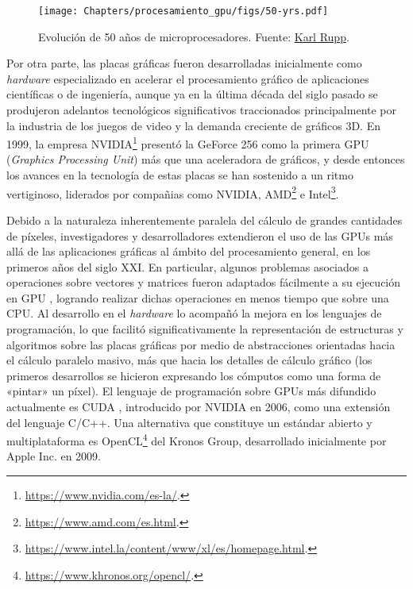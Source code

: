 \begin{figure}
\begin{center}
    \texttt{[image: Chapters/procesamiento\_gpu/figs/50-yrs.pdf]}
    \caption{Evolución de 50 años de microprocesadores. Fuente: \href{https://github.com/karlrupp/microprocessor-trend-data}{Karl Rupp}.}
    \label{fig:moore}
\end{center}
\end{figure}

Por otra parte, las placas gráficas fueron desarrolladas inicialmente como \textit{hardware} especializado en acelerar el procesamiento gráfico de aplicaciones científicas o de ingeniería, aunque ya en la última década del siglo pasado se produjeron adelantos tecnológicos significativos traccionados principalmente por la industria de los juegos de video y la demanda creciente de gráficos 3D. En 1999, la empresa NVIDIA\footnote{\url{https://www.nvidia.com/es-la/}.} presentó la GeForce 256 como la primera GPU (\textit{Graphics Processing Unit}) más que una aceleradora de gráficos, y desde entonces los avances en la tecnología de estas placas se han sostenido a un ritmo vertiginoso, liderados por compañias como NVIDIA, AMD\footnote{\url{https://www.amd.com/es.html}.} e Intel\footnote{\url{https://www.intel.la/content/www/xl/es/homepage.html}.}.

Debido a la naturaleza inherentemente paralela del cálculo de grandes cantidades de píxeles, investigadores y desarrolladores extendieron el uso de las GPUs más allá de las aplicaciones gráficas al ámbito del procesamiento general, en los primeros años del siglo XXI. En particular, algunos problemas asociados a operaciones sobre vectores y matrices fueron adaptados fácilmente a su ejecución en GPU \cite{thompson2002, bolz2003, kruger2003}, logrando realizar dichas operaciones en menos tiempo que sobre una CPU. Al desarrollo en el \textit{hardware} lo acompañó la mejora en los lenguajes de programación, lo que facilitó significativamente la representación de estructuras y algoritmos sobre las placas gráficas por medio de abstracciones orientadas hacia el cálculo paralelo masivo, más que hacia los detalles de cálculo gráfico (los primeros desarrollos se hicieron expresando los cómputos como una forma de «pintar» un píxel). El lenguaje de programación sobre GPUs más difundido actualmente es CUDA \cite{cuda}, introducido por NVIDIA en 2006, como una extensión del lenguaje C/C++. Una alternativa que constituye un estándar abierto y multiplataforma es OpenCL\footnote{\url{https://www.khronos.org/opencl/}.} del Kronos Group, desarrollado inicialmente por Apple Inc. en 2009.

